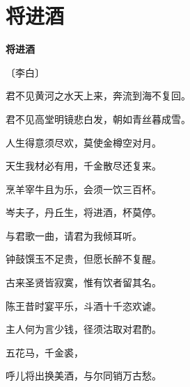 \documentclass[12pt,UTF-8,openany,fontset=none]{ctexbook}
\begin{document}
\vspace{8pt}
\clearpage

\section{将进酒}


\begin{center}
    {\bfseries 将进酒}

    \vspace{18pt}

    \begin{large}\xuwen
        〔李白〕
    \end{large}

\end{center}

    \vspace{18pt}  %

\begin{center}
    \begin{Large}

        君不见黄河之水天上来，奔流到海不复回。\hspace{42pt}

        君不见高堂明镜悲白发，朝如青丝暮成雪。\hspace{42pt}

        人生得意须尽欢，莫使金樽空对月。

        天生我材必有用，千金散尽还复来。

        烹羊宰牛且为乐，会须一饮三百杯。

        岑夫子，丹丘生，将进酒，杯莫停。

        \hspace{36pt}与君歌一曲，请君为我倾耳听。

        钟鼓馔玉不足贵，但愿长醉不复醒。

        古来圣贤皆寂寞，惟有饮者留其名。

        陈王昔时宴平乐，斗酒十千恣欢谑。

        主人何为言少钱，径须沽取对君酌。

        五花马，千金裘，

        呼儿将出换美酒，与尔同销万古愁。

    \end{Large}

\end{center}

\vspace{8pt}
\clearpage
\end{document}
